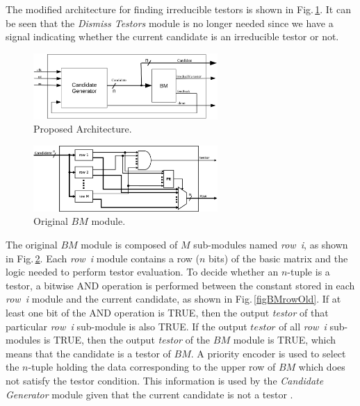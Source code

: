 \documentclass[conference]{IEEEtran}
\begin{document}
The modified architecture for finding irreducible testors is shown in Fig.\,\ref{figNewArq}. It can be seen 
that the \textit{Dismiss Testors} module is no longer needed since we have a signal indicating whether the 
current candidate is an irreducible testor or not. 

\begin{figure}[htb]
    \centering
    \includegraphics[width=7cm]{new_arq.eps}
	\caption{Proposed Architecture.}
	\label{figNewArq}
\end{figure}



\begin{figure}[htb]
    \centering
    \includegraphics[width=7cm]{BM_module_old.eps}
	\caption{Original $BM$ module.}
	\label{figBMold}
\end{figure}

The original $BM$ module is composed of $M$ sub-modules named \textit{row~i}, as shown
in Fig.\,\ref{figBMold}. Each \textit{row~i} module contains a row ($n$ bits)
of the basic matrix and the logic needed to perform testor evaluation. To decide
whether an $n$-tuple is a testor, a bitwise AND operation is performed
between the constant stored in each \textit{row~i} module and the current
candidate, as shown in Fig.\,\ref{figBMrowOld}. If at least one bit of the AND operation is TRUE,
then the output \textit{testor} of that particular \textit{row~i} sub-module is also TRUE. 
If the output $testor$ of all  \textit{row~i} sub-modules is
TRUE, then the output \textit{testor} of the $BM$ module is TRUE,
which means that the candidate is a testor of $BM$.
A priority encoder is used to select the $n$-tuple holding the data corresponding to the upper row 
of $BM$ which does not satisfy the testor condition. This information is used by the \textit{Candidate Generator}
module given that the current candidate is not a testor \cite{Rojas12}.
\end{document}
